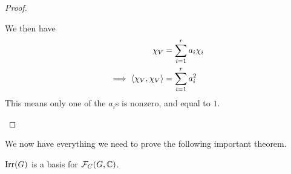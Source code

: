 \begin{proof}
\begin{enumerate}[label = \normalfont \arabic*.]
\begin{description}
            We then have
            \begin{align*}
                \chi_V &= \sum_{i=1}^{r} a_i \chi_i \\
                \implies \left\langle \chi_V, \chi_V \right\rangle &= \sum_{i=1}^{r} a_i^2
            \end{align*}
            This means only one of the $a_i$s is nonzero, and equal to $1$. %
        \end{description}
    \end{enumerate}
\end{proof}

We now have everything we need to prove the following important theorem.

\begin{theorem}
    $\operatorname{Irr}\!\left( G \right)$ is a basis for $\mathcal{F}_C\!\left( G, \mathbb{C} \right)$.
\end{theorem}
